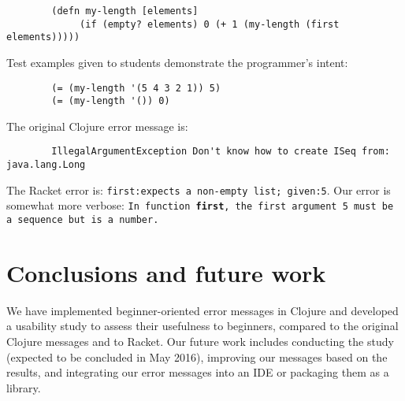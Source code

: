 \documentclass[submission,copyright,creativecommons]{eptcs}
\newcommand{\allcomments}[1]{{#1}}
\newcommand{\hfcomment}[1]{\textcolor{Teal}{\allcomments{Henry: {#1}}}}
\begin{document}
\begin{verbatim}
		(defn my-length [elements]
 			 (if (empty? elements) 0 (+ 1 (my-length (first elements)))))
\end{verbatim}
Test examples given to students demonstrate the programmer's intent: 
\begin{verbatim}
		(= (my-length '(5 4 3 2 1)) 5)
		(= (my-length '()) 0)
\end{verbatim}
The original Clojure error message is: 
\begin{verbatim}
		IllegalArgumentException Don't know how to create ISeq from: java.lang.Long 
\end{verbatim}
The Racket error is: {\tt first:expects a non-empty list; given:5}. Our error is somewhat more verbose: 
{\tt In function {\bf first}, the first argument 5 must be a sequence but is a number.}


	

\section{Conclusions and future work}\label{sec:future}
We have implemented beginner-oriented error messages in Clojure and developed a usability study to assess their usefulness to beginners,
compared to the original Clojure messages and to Racket. Our future work includes conducting the study (expected to be concluded in  May 2016), improving our messages based on the results,  
and integrating our error messages into an IDE or packaging them as a library. 




\end{document}
